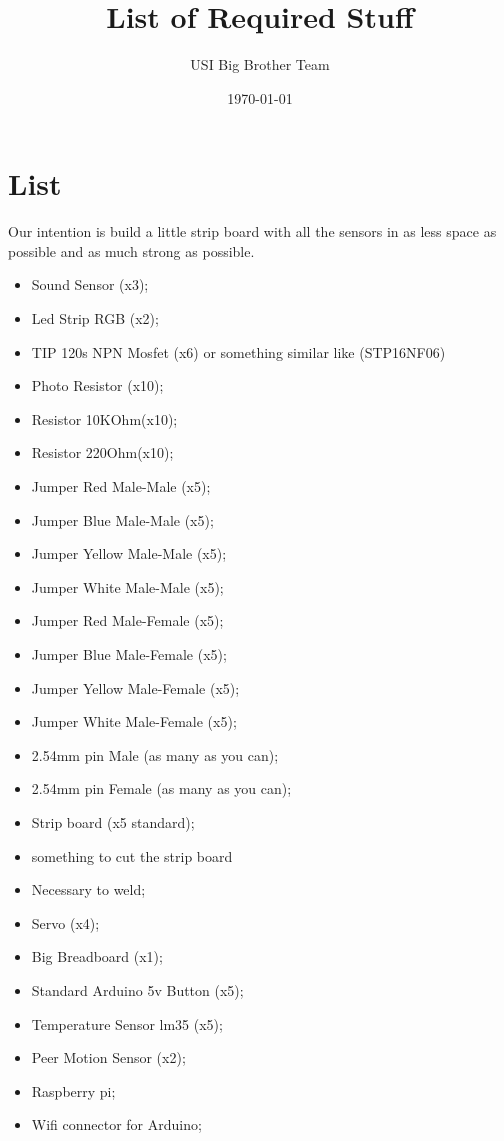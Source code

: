 \documentclass[12pt]{article}
\begin{document}
\title{List of Required Stuff}
\author{USI Big Brother Team}
\date{\today}
\maketitle
\section*{List}
Our intention is build a little strip board with all the sensors in as less space as possible and as much strong as possible.
\begin{itemize}
\item Sound Sensor (x3);
\item Led Strip RGB (x2);
\item TIP 120s NPN Mosfet (x6) or something similar like (STP16NF06)
\item Photo Resistor (x10);
\item Resistor 10KOhm(x10);
\item Resistor 220Ohm(x10);
\item Jumper Red Male-Male (x5);
\item Jumper Blue Male-Male (x5);
\item Jumper Yellow Male-Male (x5);
\item Jumper White Male-Male (x5);
\item Jumper Red Male-Female (x5);
\item Jumper Blue Male-Female (x5);
\item Jumper Yellow Male-Female (x5);
\item Jumper White Male-Female (x5);
\item 2.54mm pin Male (as many as you can);
\item 2.54mm pin Female (as many as you can);
\item Strip board (x5 standard);
\item something to cut the strip board
\item Necessary to weld;
\item Servo (x4);
\item Big Breadboard (x1);
\item Standard Arduino 5v Button (x5);
\item Temperature Sensor lm35 (x5);
\item Peer Motion Sensor (x2);
\item Raspberry pi;
\item Wifi connector for Arduino;

\end{itemize}
\end{document}
